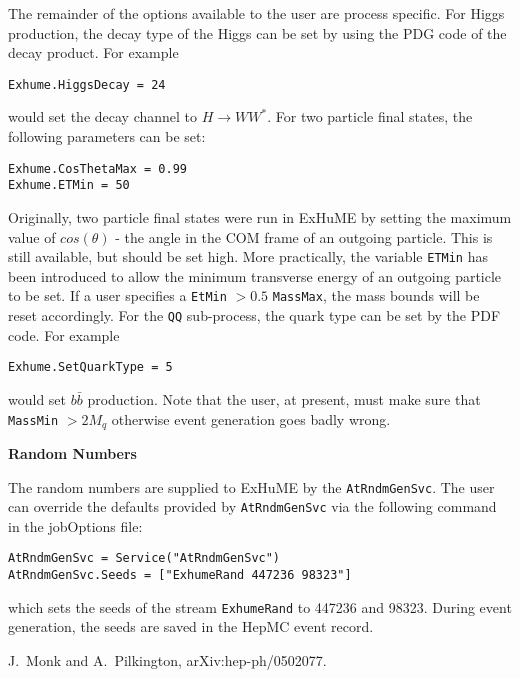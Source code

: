 \documentclass[11pt]{article}
\begin{document}
The remainder of the options available to the user are process specific. For Higgs production, the decay type of the Higgs can be set by using the PDG code of the decay product. For example
\begin{verbatim}
Exhume.HiggsDecay = 24
\end{verbatim}
would set the decay channel to $H\rightarrow WW^{*}$. For two particle final states, the following parameters can be set:
\begin{verbatim}
Exhume.CosThetaMax = 0.99
Exhume.ETMin = 50
\end{verbatim}
Originally, two particle final states were run in ExHuME by setting the maximum value of $cos(\theta)$ - the angle in the COM frame of an outgoing particle. This is still available, but should be set high. More practically, the variable \texttt{ETMin} has been introduced to allow the minimum transverse energy of an outgoing particle to be set. If a user specifies a \texttt{EtMin} $> 0.5$ \texttt{MassMax}, the mass bounds will be reset accordingly. For the \texttt{QQ} sub-process, the quark type can be set by the PDF code. For example
\begin{verbatim}
Exhume.SetQuarkType = 5
\end{verbatim}
would set $b\bar{b}$ production. Note that the user, at present, must make sure that \texttt{MassMin} $> 2M_q$ otherwise event generation goes badly wrong.

{\large \bf Random Numbers}

The random numbers are supplied to ExHuME by the \texttt{AtRndmGenSvc}. The user can override the defaults provided by \texttt{AtRndmGenSvc} via the following command in the jobOptions file:
\begin{verbatim}
AtRndmGenSvc = Service("AtRndmGenSvc")
AtRndmGenSvc.Seeds = ["ExhumeRand 447236 98323"]
\end{verbatim}
which sets the seeds of the stream \texttt{ExhumeRand} to 447236 and 98323. During event generation, the seeds are saved in the HepMC event record.

\begin{thebibliography}{10}

J.~Monk and A.~Pilkington,
arXiv:hep-ph/0502077.

\end{thebibliography}
\end{document}
